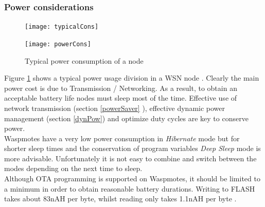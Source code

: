 \subsubsection{Power considerations}
\begin{figure}[htbp]
\centering
\texttt{[image: typicalCons]}
\end{figure} 
\begin{figure}[htbp]
\centering
\texttt{[image: powerCons]}
\caption{Typical power consumption of a node}
\label{fig:typicalCons2}
\end{figure}
\noindent Figure \ref{fig:typicalCons2} shows a typical power usage division in a WSN node \citep{NIWSN}. Clearly the main power cost is due to Transmission / Networking. As a result, to obtain an acceptable battery life nodes must sleep most of the time. Effective use of network transmission (section \ref{powerSaver} ), effective dynamic power management (section \ref{dynPow}) and optimize duty cycles are key to conserve power.\\
Waspmotes have a very low power consumption in \textit{Hibernate} mode but for shorter sleep times and the conservation of program variables \textit{Deep Sleep} mode is more advisable. Unfortunately it is not easy to combine and switch between the modes depending on the next time to sleep.\\
Although OTA programming is supported on Waspmotes, it should be limited to a minimum in order to obtain reasonable battery durations. Writing to FLASH takes about 83nAH per byte, whilst reading only takes 1.1nAH per byte \citep{KTH}. 
